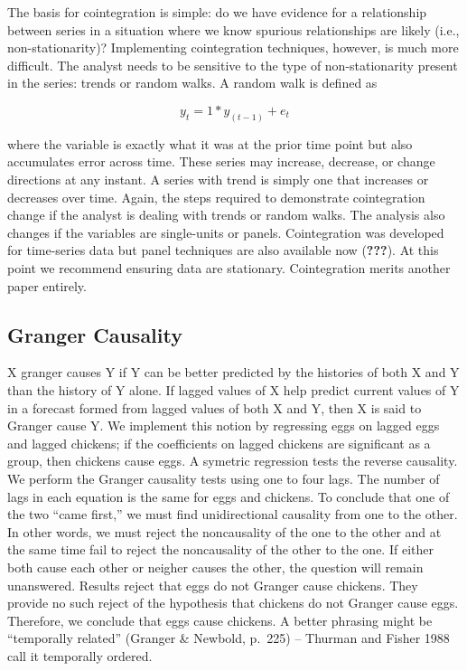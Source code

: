 \documentclass[english,,man]{apa6}
\theoremstyle{definition}
\theoremstyle{definition}
\theoremstyle{definition}
\theoremstyle{remark}
\begin{document}
The basis for cointegration is simple: do we have evidence for a
relationship between series in a situation where we know spurious
relationships are likely (i.e., non-stationarity)? Implementing
cointegration techniques, however, is much more difficult. The analyst
needs to be sensitive to the type of non-stationarity present in the
series: trends or random walks. A random walk is defined as

\begin{equation}
y_{t} = 1*y_{(t-1)} + e_{t}
\end{equation}

\noindent where the variable is exactly what it was at the prior time
point but also accumulates error across time. These series may increase,
decrease, or change directions at any instant. A series with trend is
simply one that increases or decreases over time. Again, the steps
required to demonstrate cointegration change if the analyst is dealing
with trends or random walks. The analysis also changes if the variables
are single-units or panels. Cointegration was developed for time-series
data but panel techniques are also available now ({\textbf{???}}). At
this point we recommend ensuring data are stationary. Cointegration
merits another paper entirely.

\hypertarget{granger-causality}{%
\subsection{Granger Causality}\label{granger-causality}}

X granger causes Y if Y can be better predicted by the histories of both
X and Y than the history of Y alone. If lagged values of X help predict
current values of Y in a forecast formed from lagged values of both X
and Y, then X is said to Granger cause Y. We implement this notion by
regressing eggs on lagged eggs and lagged chickens; if the coefficients
on lagged chickens are significant as a group, then chickens cause eggs.
A symetric regression tests the reverse causality. We perform the
Granger causality tests using one to four lags. The number of lags in
each equation is the same for eggs and chickens. To conclude that one of
the two \enquote{came first,} we must find unidirectional causality from
one to the other. In other words, we must reject the noncausality of the
one to the other and at the same time fail to reject the noncausality of
the other to the one. If either both cause each other or neigher causes
the other, the question will remain unanswered. Results reject that eggs
do not Granger cause chickens. They provide no such reject of the
hypothesis that chickens do not Granger cause eggs. Therefore, we
conclude that eggs cause chickens. A better phrasing might be
\enquote{temporally related} (Granger \& Newbold, p.~225) -- Thurman and
Fisher 1988 call it temporally ordered.
\end{document}
